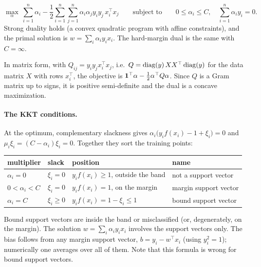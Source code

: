 \begin{notechapter}
\begin{proposition}\label{svm:prop:dual}
\[
  \max_\alpha\ \sum_{i=1}^n\alpha_i - \frac12\sum_{i=1}^n\sum_{j=1}^n\alpha_i\alpha_jy_iy_j\,x_i^\top x_j
  \qquad\text{subject to}\qquad 0\leq\alpha_i\leq C,\quad\sum_{i=1}^n\alpha_iy_i = 0 .
\]
Strong duality holds (a convex quadratic program with affine constraints), and the
primal solution is $w = \sum_i\alpha_iy_ix_i$. The hard-margin dual is the same with $C = \infty$.
\end{proposition}

In matrix form, with $Q_{ij} = y_iy_jx_i^\top x_j$, i.e.\ $Q = \operatorname{diag}(y)\,XX^\top\operatorname{diag}(y)$ for the data matrix $X$ with
rows $x_i^\top$, the objective is $\mathbf{1}^\top\alpha - \frac12\alpha^\top Q\alpha$. Since $Q$ is a Gram matrix up to signs, it is
positive semi-definite and the dual is a concave maximization.

\paragraph{The KKT conditions.} At the optimum, complementary slackness gives
$\alpha_i\bigl(y_if(x_i) - 1 + \xi_i\bigr) = 0$ and $\mu_i\xi_i = (C - \alpha_i)\xi_i = 0$. Together they sort the training points:
\begin{center}
\begin{tabular}{@{}llll@{}}
\toprule
multiplier & slack & position & name \\
\midrule
$\alpha_i = 0$ & $\xi_i = 0$ & $y_if(x_i)\geq1$, outside the band & not a support vector \\
$0<\alpha_i<C$ & $\xi_i = 0$ & $y_if(x_i) = 1$, on the margin & margin support vector \\
$\alpha_i = C$ & $\xi_i\geq0$ & $y_if(x_i) = 1 - \xi_i\leq1$ & bound support vector \\
\bottomrule
\end{tabular}
\end{center}
Bound support vectors are inside the band or misclassified (or, degenerately, on the
margin). The solution $w = \sum_i\alpha_iy_ix_i$ involves the support vectors only. The bias follows
from any margin support vector, $b = y_i - w^\top x_i$ (using $y_i^2 = 1$); numerically one averages
over all of them. Note that this formula is wrong for bound support vectors.


\end{notechapter}
